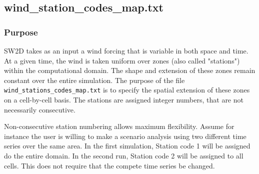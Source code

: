 \subsection{wind\_station\_codes\_map.txt}\label{sec_SourceTerm!Wind!windStationMap}
\subsubsection{Purpose}
SW2D takes as an input a wind forcing that is variable in both space and time. At a given time, the wind is taken uniform over zones (also called "stations") within the computational domain. The shape and extension of these zones remain constant over the entire simulation. The purpose of the file \texttt{wind\_stations\_codes\_map.txt} is to specify the spatial extension of these zones on a cell-by-cell basis. The stations are assigned integer numbers, that are not necessarily consecutive. 

Non-consecutive station numbering allows maximum flexibility. Assume for instance the user is willing to make a scenario analysis using two different time series over the same area. In the first simulation, Station code 1 will be assigned do the entire domain. In the second run, Station code 2 will be assigned to all cells. This does not require that the compete time series be changed.
%
